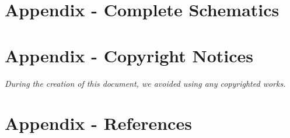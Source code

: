 \section{Appendix - Complete Schematics}

\label{apx:base-station-sch}

\section{Appendix - Copyright Notices}
\emph{During the creation of this document, we avoided using any copyrighted works.}

\thispagestyle{empty}
\pagestyle{empty}

\section{Appendix - References}

\renewcommand{\refname}{\centerline{\Large\bf References Cited}}


